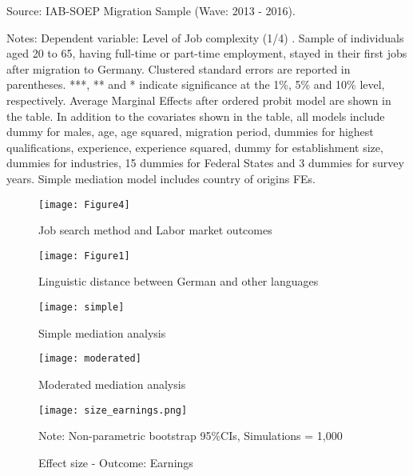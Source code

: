 \documentclass[12pt,a4paper]{article}
\begin{document}
\begin{landscape}
\begin{table}[htbp]
\begin{tablenotes}
      \small
      \item Source: IAB-SOEP Migration Sample (Wave: 2013 - 2016).
      \item Notes: Dependent variable: Level of Job complexity (1/4) . Sample of individuals aged 20 to 65, having full-time or part-time employment, stayed in their first jobs after migration to Germany. Clustered standard errors are reported in parentheses.  ***, ** and * indicate significance at the 1\%, 5\% and 10\% level, respectively. Average Marginal Effects after ordered probit model are shown in the table. In addition to the covariates shown in the table, all models include dummy for males, age, age squared, migration period, dummies for highest qualifications, experience, experience squared, dummy for establishment size, dummies for industries, 15 dummies for Federal States and 3 dummies for survey years. Simple mediation model includes country of origins FEs.
    \end{tablenotes}

\end{table}%

\end{landscape}

\begin{figure}
\centering     %
\texttt{[image: Figure4]}
\caption{Job search method and Labor market outcomes}
\end{figure}


\begin{figure}
\centering     %
\texttt{[image: Figure1]}
\caption{Linguistic distance between German and other languages}
\end{figure}

\begin{figure}
\centering     %
\texttt{[image: simple]}
\caption{Simple mediation analysis}
\end{figure}

\begin{figure}
\centering     %
\texttt{[image: moderated]}
\caption{Moderated mediation analysis}
\end{figure}

\begin{figure}
\centering
\texttt{[image: size\_earnings.png]}
  \caption{Effect size - Outcome: Earnings}
\small{Note: Non-parametric bootstrap 95\%CIs, Simulations = 1,000}
\end{figure}
\end{document}
